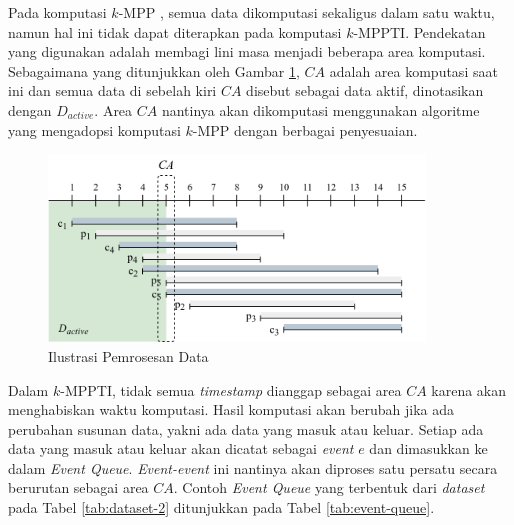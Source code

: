 Pada komputasi $k$-MPP \cite{kmpp}, semua data dikomputasi sekaligus dalam satu waktu, namun hal ini tidak dapat diterapkan pada komputasi $k$-MPPTI. Pendekatan yang digunakan adalah membagi lini masa menjadi beberapa area komputasi. Sebagaimana yang ditunjukkan oleh Gambar \ref{fig:timeline-color}, $CA$ adalah area komputasi saat ini dan semua data di sebelah kiri $CA$ disebut sebagai data aktif, dinotasikan dengan $D_{active}$. Area $CA$ nantinya akan dikomputasi menggunakan algoritme yang mengadopsi komputasi $k$-MPP \cite{kmpp} dengan berbagai penyesuaian.
 
\begin{figure}[H]
	\centering
	\includegraphics[width=10cm]{bab3/img/timeline-color.png}
	\caption{Ilustrasi Pemrosesan Data}
	\label{fig:timeline-color}
\end{figure}

Dalam $k$-MPPTI, tidak semua \textit{timestamp} dianggap sebagai area $CA$ karena akan menghabiskan waktu komputasi. Hasil komputasi akan berubah jika ada perubahan susunan data, yakni ada data yang masuk atau keluar. Setiap ada data yang masuk atau keluar akan dicatat sebagai \textit{event} $e$ dan dimasukkan ke dalam \textit{Event Queue}. \textit{Event-event} ini nantinya akan diproses satu persatu secara berurutan sebagai area $CA$. Contoh \textit{Event Queue} yang terbentuk dari \textit{dataset} pada Tabel \ref{tab:dataset-2} ditunjukkan pada Tabel \ref{tab:event-queue}.


